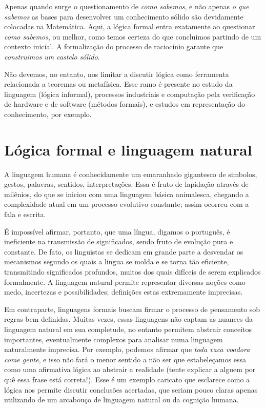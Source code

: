 Apenas quando surge o questionamento de \textit{como sabemos}, e não apenas \textit{o que sabemos} as bases para desenvolver um conhecimento sólido são devidamente colocadas na Matemática.
Aqui, a lógica formal entra exatamente ao questionar \textit{como sabemos}, ou melhor, como temos certeza do que concluimos partindo de um contexto inicial.
A formalização do processo de raciocínio garante que \textit{construimos um castelo sólido}.

Não devemos, no entanto, nos limitar a discutir lógica como ferramenta relacionada a teoremas ou metafísica. Esse ramo é presente no estudo da linguagem (lógica informal), processos industriais e computação pela verificação de hardware e de software (métodos formais), e estudos em representação do conhecimento, por exemplo.

\section{Lógica formal e linguagem natural}
A linguagem humana é conhecidamente um emaranhado gigantesco de simbolos, gestos, palavras, sentidos, interpretações.
Essa é fruto de lapidação através de milênios, do que se iniciou com uma linguagem básica animalesca, chegando a complexidade atual em um processo evolutivo constante; assim ocorreu com a fala e escrita.

É impossível afirmar, portanto, que uma língua, digamos o português, é ineficiente na transmissão de significados, sendo fruto de evolução pura e constante.
De fato, os linguistas se dedicam em grande parte a desvendar os mecanismos segundo os quais a lingua se molda e se torna tão eficiente, transmitindo significados profundos, muitos dos quais difíceis de serem explicados formalmente. A linguagem natural permite representar diversas noções como medo, incertezas e possibilidades; definições estas extremamente imprecisas.

Em contraparte, linguagens formais buscam firmar o processo de pensamento sob regras bem definidas. Muitas vezes, essas linguagens não captam as nuances da linguagem natural em sua completude, no entanto permitem abstrair conceitos importantes, eventualmente complexos para analisar numa linguagem naturalmente imprecisa.
Por exemplo, podemos afirmar que \textit{toda vaca voadora come gente}, e isso não fará o menor sentido a não ser que estabeleçamos essa como uma afirmativa lógica ao abstrair a realidade (tente explicar a alguem por quê essa frase está correta!).
Esse é um exemplo caricato que esclarece como a lógica nos permite discutir conclusões acertadas, que seriam pouco claras apenas utilizando de um arcabouço de linguagem natural ou da cognição humana.

